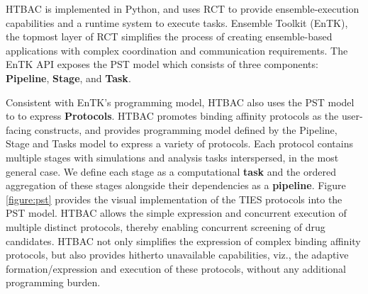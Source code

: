 




HTBAC is implemented in Python, and uses RCT to provide ensemble-execution
capabilities and a runtime system to execute tasks. Ensemble Toolkit (EnTK),
the topmost layer of RCT simplifies the process of creating ensemble-based
applications with complex coordination and communication requirements. The
EnTK API exposes the PST model which consists of three components:
\textbf{Pipeline}, \textbf{Stage}, and \textbf{Task}. 


Consistent with EnTK's programming model, HTBAC also uses the PST model to to
express {\bf Protocols}. HTBAC promotes binding affinity protocols as the
user-facing constructs, and provides programming model defined by the
Pipeline, Stage and Tasks model to express a variety of protocols. Each
protocol contains multiple stages with simulations and analysis tasks
interspersed, in the most general case. We define each stage as a
computational \textbf{task} and the ordered aggregation of these stages
alongside their dependencies as a \textbf{pipeline}. Figure \ref{figure:pst} provides the visual implementation of the TIES protocols into the PST model. HTBAC allows the simple
expression and concurrent execution of multiple distinct protocols, thereby
enabling concurrent screening of drug candidates. HTBAC not only simplifies
the expression of complex binding affinity protocols, but also provides
hitherto unavailable capabilities, viz., the adaptive formation/expression
and execution of these protocols, without any additional programming burden.

